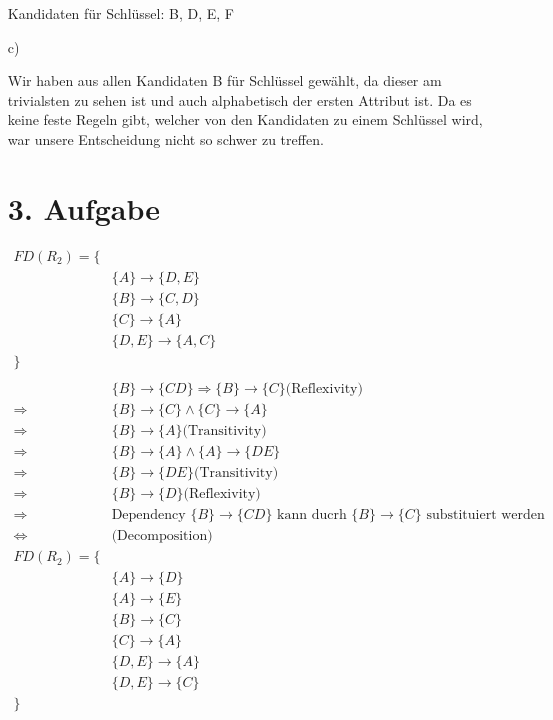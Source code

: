 \begin{itemize}
Kandidaten für Schlüssel: B, D, E, F

\item[c)]

Wir haben aus allen Kandidaten B für Schlüssel gewählt, da dieser am trivialsten zu sehen ist und auch alphabetisch der ersten Attribut ist. Da es keine feste Regeln gibt, welcher von den Kandidaten zu einem Schlüssel wird, war unsere Entscheidung nicht so schwer zu treffen.

\section*{3. Aufgabe}

\begin{align*}
FD(R_2) = \{ & \\
& \{A\} \rightarrow \{D, E\} \\
& \{B\} \rightarrow \{C, D\} \\
& \{C\} \rightarrow \{A\} \\
& \{D, E\} \rightarrow \{A, C\} \\
\} & \\ \\
%
& \{B\} \rightarrow \{CD\} \Rightarrow \{B\} \rightarrow \{C\} \text{(Reflexivity)} \\
\Rightarrow & \{B\} \rightarrow \{C\} \land \{C\} \rightarrow \{A\} \\
\Rightarrow & \{B\} \rightarrow \{A\} \text{(Transitivity)} \\
\Rightarrow & \{B\} \rightarrow \{A\} \land \{A\} \rightarrow \{DE\} \\
\Rightarrow & \{B\} \rightarrow \{DE\} \text{(Transitivity)} \\
\Rightarrow & \{B\} \rightarrow \{D\} \text{(Reflexivity)} \\
\Rightarrow & \text{Dependency } \{B\} \rightarrow \{CD\} \text{ kann ducrh } \{B\} \rightarrow \{C\} \text{ substituiert werden} \\
%
\Leftrightarrow & \text{(Decomposition)}\\
FD(R_2) = \{ & \\
& \{A\} \rightarrow \{D\} \\
& \{A\} \rightarrow \{E\} \\
& \{B\} \rightarrow \{C\} \\
& \{C\} \rightarrow \{A\} \\
& \{D, E\} \rightarrow \{A\} \\
& \{D, E\} \rightarrow \{C\} \\
\} & \\ \\ \\
\end{align*}

\end{itemize}




